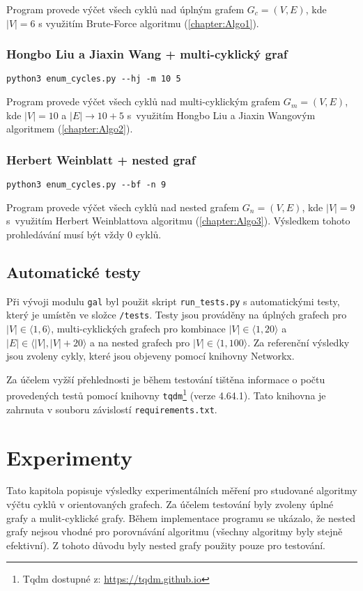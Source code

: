             \vspace*{0.5em}
            Program provede výčet všech cyklů nad úplným grafem $G_c = (V, E)$, kde $|V| = 6$ s využitím Brute-Force algoritmu (\ref{chapter:Algo1}).

        \subsection*{Hongbo Liu a Jiaxin Wang + multi-cyklický graf}
            \texttt{python3 enum\_cycles.py -{}-hj -m 10 5}

            \vspace*{0.5em}
            Program provede výčet všech cyklů nad multi-cyklickým grafem $G_m = (V, E)$, kde $|V| = 10$ a $|E| \rightarrow 10 + 5$ s~využitím Hongbo Liu a Jiaxin Wangovým algoritmem (\ref{chapter:Algo2}).

        \subsection*{Herbert Weinblatt + nested graf}
            \texttt{python3 enum\_cycles.py -{}-bf -n 9}

            \vspace*{0.5em}
            Program provede výčet všech cyklů nad nested grafem $G_n = (V, E)$, kde $|V| = 9$ s~využitím Herbert Weinblattova algoritmu (\ref{chapter:Algo3}). Výsledkem tohoto prohledávání musí být vždy 0 cyklů.

    \section{Automatické testy}
        Při vývoji modulu \texttt{gal} byl použit skript \texttt{run\_tests.py} s automatickými testy, který je umístěn ve složce \texttt{/tests}. Testy jsou prováděny na úplných grafech pro $|V| \in \langle 1, 6 \rangle$, multi-cyklických grafech pro kombinace $|V| \in \langle 1, 20 \rangle$ a $|E| \in \langle |V|, |V| + 20 \rangle$ a na nested grafech pro $|V| \in \langle 1, 100 \rangle$. Za referenční výsledky jsou zvoleny cykly, které jsou objeveny pomocí knihovny Networkx.

        Za účelem vyžší přehlednosti je během testování tištěna informace o počtu provedených testů pomocí knihovny \texttt{tqdm}\footnote{Tqdm dostupné z: \url{https://tqdm.github.io}} (verze 4.64.1). Tato knihovna je zahrnuta v souboru závislostí \texttt{requirements.txt}.


\chapter{Experimenty}
    \label{chapter:Experiments}
    Tato kapitola popisuje výsledky experimentálních měření pro studované algoritmy výčtu cyklů v orientovaných grafech. Za účelem testování byly zvoleny úplné grafy a mulit-cyklické grafy. Během implementace programu se ukázalo, že nested grafy nejsou vhodné pro porovnávání algoritmu (všechny algoritmy byly stejně efektivní). Z tohoto důvodu byly nested grafy použity pouze pro testování.

